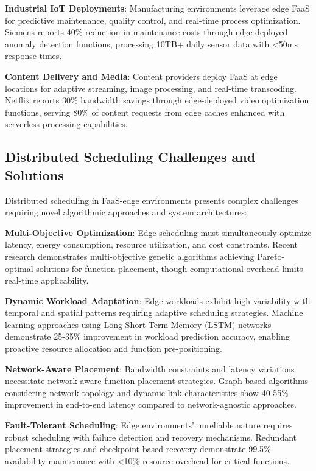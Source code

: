 \textbf{Industrial IoT Deployments}: Manufacturing environments leverage edge FaaS for predictive maintenance, quality control, and real-time process optimization. Siemens reports 40\% reduction in maintenance costs through edge-deployed anomaly detection functions, processing 10TB+ daily sensor data with <50ms response times.

\textbf{Content Delivery and Media}: Content providers deploy FaaS at edge locations for adaptive streaming, image processing, and real-time transcoding. Netflix reports 30\% bandwidth savings through edge-deployed video optimization functions, serving 80\% of content requests from edge caches enhanced with serverless processing capabilities.

\subsection{Distributed Scheduling Challenges and Solutions}

Distributed scheduling in FaaS-edge environments presents complex challenges requiring novel algorithmic approaches and system architectures:

\textbf{Multi-Objective Optimization}: Edge scheduling must simultaneously optimize latency, energy consumption, resource utilization, and cost constraints. Recent research demonstrates multi-objective genetic algorithms achieving Pareto-optimal solutions for function placement, though computational overhead limits real-time applicability.

\textbf{Dynamic Workload Adaptation}: Edge workloads exhibit high variability with temporal and spatial patterns requiring adaptive scheduling strategies. Machine learning approaches using Long Short-Term Memory (LSTM) networks demonstrate 25-35\% improvement in workload prediction accuracy, enabling proactive resource allocation and function pre-positioning.

\textbf{Network-Aware Placement}: Bandwidth constraints and latency variations necessitate network-aware function placement strategies. Graph-based algorithms considering network topology and dynamic link characteristics show 40-55\% improvement in end-to-end latency compared to network-agnostic approaches.

\textbf{Fault-Tolerant Scheduling}: Edge environments' unreliable nature requires robust scheduling with failure detection and recovery mechanisms. Redundant placement strategies and checkpoint-based recovery demonstrate 99.5\% availability maintenance with <10\% resource overhead for critical functions.

